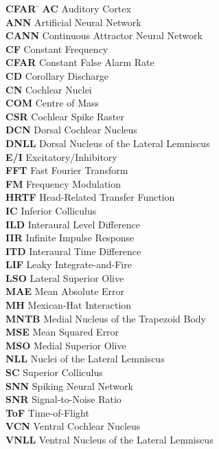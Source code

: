 

\begin{tabbing}
    \textbf{CFAR} \qquad \= \kill
    \textbf{AC} \> Auditory Cortex \\
    \textbf{ANN} \> Artificial Neural Network \\
    \textbf{CANN} \> Continuous Attractor Neural Network \\
    \textbf{CF} \> Constant Frequency \\
    \textbf{CFAR} \> Constant False Alarm Rate \\
    \textbf{CD} \> Corollary Discharge \\
    \textbf{CN} \> Cochlear Nuclei \\
    \textbf{COM} \> Centre of Mass \\
    \textbf{CSR} \> Cochlear Spike Raster \\
    \textbf{DCN} \> Dorsal Cochlear Nucleus \\
    \textbf{DNLL} \> Dorsal Nucleus of the Lateral Lemniscus \\
    \textbf{E/I} \> Excitatory/Inhibitory \\
    \textbf{FFT} \> Fast Fourier Transform \\
    \textbf{FM} \> Frequency Modulation \\
    \textbf{HRTF} \> Head-Related Transfer Function \\
    \textbf{IC} \> Inferior Colliculus \\
    \textbf{ILD} \> Interaural Level Difference \\
    \textbf{IIR} \> Infinite Impulse Response \\
    \textbf{ITD} \> Interaural Time Difference \\
    \textbf{LIF} \> Leaky Integrate-and-Fire \\
    \textbf{LSO} \> Lateral Superior Olive \\
    \textbf{MAE} \> Mean Absolute Error \\
    \textbf{MH} \> Mexican-Hat Interaction \\
    \textbf{MNTB} \> Medial Nucleus of the Trapezoid Body \\
    \textbf{MSE} \> Mean Squared Error \\
    \textbf{MSO} \> Medial Superior Olive \\
    \textbf{NLL} \> Nuclei of the Lateral Lemniscus \\
    \textbf{SC} \> Superior Colliculus \\
    \textbf{SNN} \> Spiking Neural Network \\
    \textbf{SNR} \> Signal-to-Noise Ratio \\
    \textbf{ToF} \> Time-of-Flight \\
    \textbf{VCN} \> Ventral Cochlear Nucleus \\
    \textbf{VNLL} \> Ventral Nucleus of the Lateral Lemniscus
\end{tabbing}

